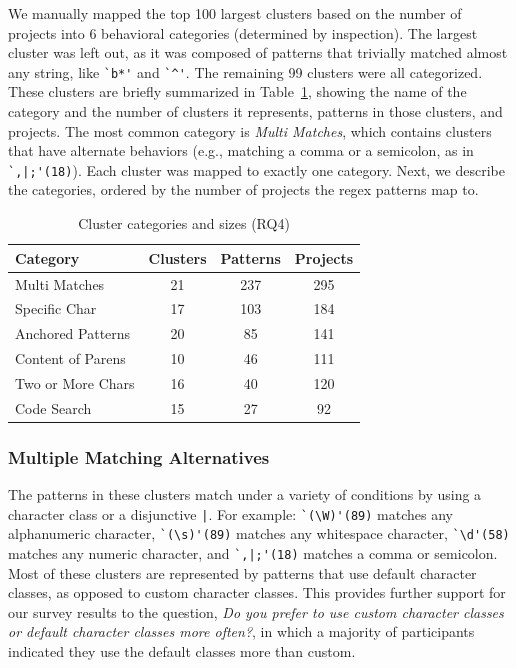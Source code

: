 We manually mapped the top 100 largest clusters based on the number of projects into 6 behavioral categories (determined by inspection).  The largest cluster was left out, as it was composed of patterns that trivially matched almost any string, like \verb!`b*'! and \verb!`^'!.  The remaining 99 clusters were all categorized. These clusters are briefly summarized in Table~\ref{tab:clustercats}, showing the name of the category and the number of clusters it represents, patterns in those clusters, and projects. The most common category is \emph{Multi Matches}, which contains clusters that have alternate behaviors (e.g., matching a comma or a semicolon, as in \verb!`,|;'(18)!). Each cluster was mapped to exactly one category. Next, we describe the categories, ordered by the number of projects the regex patterns map to.

\begin{table}
\begin{center}
\begin{small}

\caption{Cluster categories and sizes (RQ4) \label{tab:clustercats}}
\begin{tabular}{lccc}
\toprule
\textbf{Category} & \textbf{Clusters} & \textbf{Patterns} & \textbf{Projects} \\  \hline \bigstrut
Multi Matches & 21 & 237 & 295\\
\hline \bigstrut
Specific Char & 17 & 103 & 184\\
\hline \bigstrut
Anchored Patterns & 20 & 85 & 141\\
\hline \bigstrut
 Content of Parens & 10 & 46 & 111\\
\hline \bigstrut
Two or More Chars & 16 & 40 & 120\\
\hline \bigstrut
Code Search & 15 & 27 & 92 \\
\bottomrule
\end{tabular}
\vspace{-12pt}
\end{small}
\end{center}
\end{table}

\subsubsection{Multiple Matching Alternatives}
The patterns in these clusters match under a variety of conditions by using a character class or a disjunctive \verb!|!.
For example:
\verb!`(\W)'(89)! matches any alphanumeric character, \verb!`(\s)'(89)! matches any whitespace character, \verb!`\d'(58)! matches any numeric character, and \verb!`,|;'(18)! matches a comma or semicolon.  Most of these clusters are represented by patterns that use default character classes, as opposed to custom character classes.  This provides further support for our survey results to the question, \emph{Do you prefer to use custom character classes or default character classes more often?}, in which a majority of participants indicated they use the default classes more than custom.

